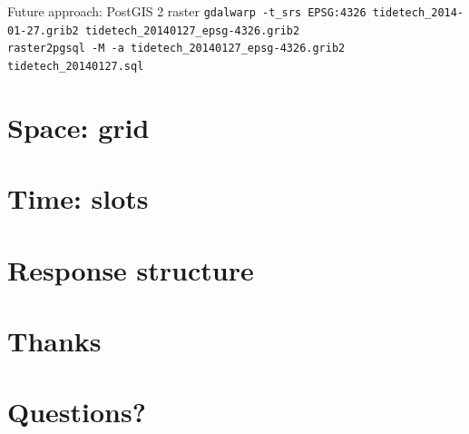 \documentclass[xcolor=svgnames]{beamer}
\begin{document}
        \begin{frame}{Future approach: PostGIS 2 raster}
            \tiny{
                \texttt{gdalwarp -t\_srs EPSG:4326 tidetech\_2014-01-27.grib2 tidetech\_20140127\_epsg-4326.grib2}\\
                \texttt{raster2pgsql -M -a tidetech\_20140127\_epsg-4326.grib2 tidetech\_20140127.sql}
        }
        \end{frame}

\section{Space: grid}

    \begin{frame}
    \end{frame}

\section{Time: slots}

    \begin{frame}
    \end{frame}

\section{Response structure}

    \begin{frame}
    \end{frame}

\section{Thanks}

    \begin{frame}
    \end{frame}

\section{Questions?}

    \begin{frame}
    \end{frame}
\end{document}
